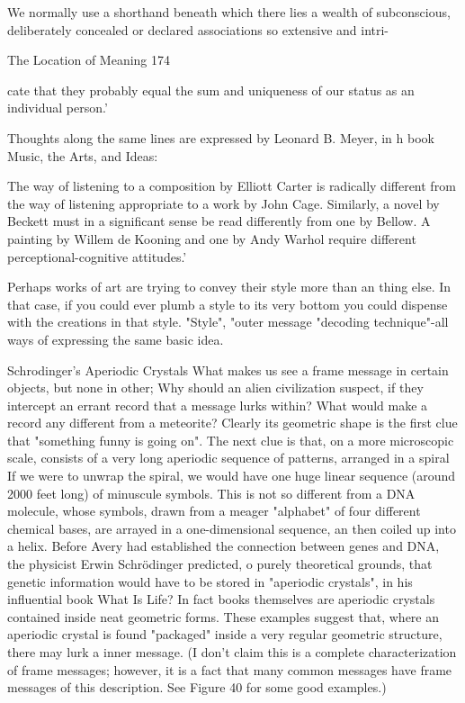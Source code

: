    We normally use a shorthand beneath which there lies a wealth of subconscious,
   deliberately concealed or declared associations so extensive and intri-




The Location of Meaning                                                                 174

   cate that they probably equal the sum and uniqueness of our status as an individual person.'

Thoughts along the same lines are expressed by Leonard B. Meyer, in h book Music, the
Arts, and Ideas:

   The way of listening to a composition by Elliott Carter is radically different from the way
   of listening appropriate to a work by John Cage. Similarly, a novel by Beckett must in a
   significant sense be read differently from one by Bellow. A painting by Willem de
   Kooning and one by Andy Warhol require different perceptional-cognitive attitudes.'

        Perhaps works of art are trying to convey their style more than an thing else. In
that case, if you could ever plumb a style to its very bottom you could dispense with the
creations in that style. "Style", "outer message "decoding technique"-all ways of
expressing the same basic idea.

                          Schrodinger's Aperiodic Crystals
        What makes us see a frame message in certain objects, but none in other; Why
should an alien civilization suspect, if they intercept an errant record that a message lurks
within? What would make a record any different from a meteorite? Clearly its geometric
shape is the first clue that "something funny is going on". The next clue is that, on a more
microscopic scale, consists of a very long aperiodic sequence of patterns, arranged in a
spiral If we were to unwrap the spiral, we would have one huge linear sequence (around
2000 feet long) of minuscule symbols. This is not so different from a DNA molecule,
whose symbols, drawn from a meager "alphabet" of four different chemical bases, are
arrayed in a one-dimensional sequence, an then coiled up into a helix. Before Avery had
established the connection between genes and DNA, the physicist Erwin Schrödinger
predicted, o purely theoretical grounds, that genetic information would have to be stored
in "aperiodic crystals", in his influential book What Is Life? In fact books themselves are
aperiodic crystals contained inside neat geometric forms. These examples suggest that,
where an aperiodic crystal is found "packaged" inside a very regular geometric structure,
there may lurk a inner message. (I don't claim this is a complete characterization of frame
messages; however, it is a fact that many common messages have frame messages of this
description. See Figure 40 for some good examples.)

